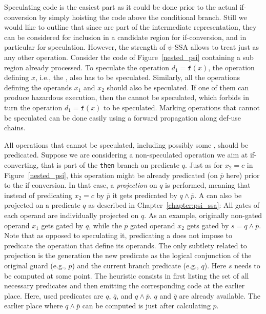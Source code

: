 Speculating code is the easiest part as it could be done prior to the actual if-conversion by simply hoisting the code above the conditional branch. 
Still we would like to outline that since \psifuns are part of the intermediate representation, they can be considered for inclusion in a candidate region for if-conversion, and in particular for speculation. 
However, the strength of $\psi$-SSA allows to treat \psifuns just as any other operation. 
Consider the code of Figure~\ref{nested_psi} containing a sub region already processed. 
To speculate the operation $d_1=\texttt{f}(x)$, the operation defining $x$, i.e., the \psifun, also has to be speculated. 
Similarly, all the operations defining the operands $x_1$ and $x_2$ should also be speculated. 
If one of them can produce hazardous execution, then the \psifun cannot be speculated, which forbids in turn the operation $d_1=\texttt{f}(x)$ to be speculated. 
Marking operations that cannot be speculated can be done easily using a forward propagation along def-use chains.

All operations that cannot be speculated, including possibly some \psifuns, should be predicated. 
Suppose we are considering a non-speculated operation we aim at if-converting, that is part of the \texttt{then} branch on predicate $q$. 
Just as for $x_2=c$ in Figure~\ref{nested_psi}, this operation might be already predicated (on $\overline{p}$ here) prior to the if-conversion. 
In that case, a \textit{projection} on $q$ is performed, meaning that instead of predicating $x_2=c$ by $\overline{p}$ it gets predicated by $q\wedge \overline{p}$. 
A \psifun can also be projected on a predicate $q$ as described in Chapter~\ref{chapter:psi_ssa}: 
All gates of each operand are individually projected on $q$. 
As an example, originally non-gated operand $x_1$ gets gated by $q$, while the $\overline{p}$ gated operand $x_2$ gets gated by $s=q\wedge\overline{p}$. 
Note that as opposed to speculating it, predicating a \psifun does not impose to predicate the operation that define its operands. 
The only subtlety related to projection is the generation the new predicate as the logical conjunction of the original guard (e.g., $\overline{p}$) and the current branch predicate (e.g., $q$). 
Here $s$ needs to be computed at some point. 
The heuristic consists in first listing the set of all necessary predicates and then emitting the corresponding code at the earlier place. 
Here, used predicates are $q$, $\overline{q}$, and $q\wedge\overline{p}$. 
$q$ and $\overline{q}$ are already available. 
The earlier place where $q\wedge\overline{p}$ can be computed is just after calculating $p$.


